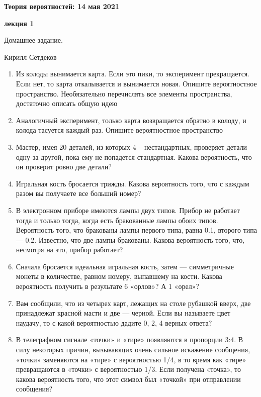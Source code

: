 \documentclass[a4paper,12pt]{article}
\newcounter{z}
\renewcommand{\date}{{\bf 14 мая 2021}}
\newcommand{\HSEhat}{
\vspace*{-0pt}
\noindent
\setcounter{z}{0}


{\bf \phantom{\date}  \large \hfill Теория вероятностей: \hfill \normalsize \date}

\vspace{5 pt}
{\bf \large \hfill  лекция 1\hfill }

\vspace{15 pt}
\centerline{ \large  Домашнее задание.}
\centerline{ \large  Кирилл Сетдеков}



\vspace*{10pt}
\setcounter{z}{0}

}
\begin{document}
\HSEhat


\begin{enumerate}

\subsection*{Задачи:}



\item Из колоды вынимается карта. Если это пики, то эксперимент прекращается. Если нет, то карта откалывается и вынимается новая. Опишите вероятностное пространство. Необязательно перечислять все элементы пространства, достаточно описать общую идею

\item Аналогичный эксперимент, только карта возвращается обратно в колоду, и колода тасуется каждый раз. Опишите вероятностное пространство
\item Мастер, имея 20 деталей, из которых 4 – нестандартных, проверяет детали одну за другой, пока ему не попадется стандартная. Какова вероятность, что он проверит ровно две детали? 
\item Игральная кость бросается трижды. Какова вероятность того, что с каждым разом вы получаете все больший номер? 
\item В электронном приборе имеются лампы двух типов. Прибор не работает тогда и только тогда, когда есть бракованные лампы обоих типов. Вероятность того, что бракованы лампы первого типа, равна 0.1, второго типа — 0.2. Известно, что две лампы бракованы. Какова вероятность того, что, несмотря на это, прибор работает?
\item Сначала бросается идеальная игральная кость, затем — симметричные монеты в количестве, равном номеру, выпавшему на кости. Какова вероятность получить в результате 6 «орлов»? А 1 «орел»? 
\item Вам сообщили, что из четырех карт, лежащих на столе рубашкой вверх, две принадлежат красной масти и две — черной. Если вы называете цвет наудачу, то с какой вероятностью дадите 0, 2, 4 верных ответа?
\item В телеграфном сигнале «точки» и «тире» появляются в пропорции 3:4. В силу некоторых причин, вызывающих очень сильное искажение сообщения, «точки» заменяются на «тире» с вероятностью 1/4, в то время как «тире» превращаются в «точки» с вероятностью 1/3. Если получена «точка», то какова вероятность того, что этот символ был «точкой» при отправлении сообщения?



\end{enumerate}
\end{document}
